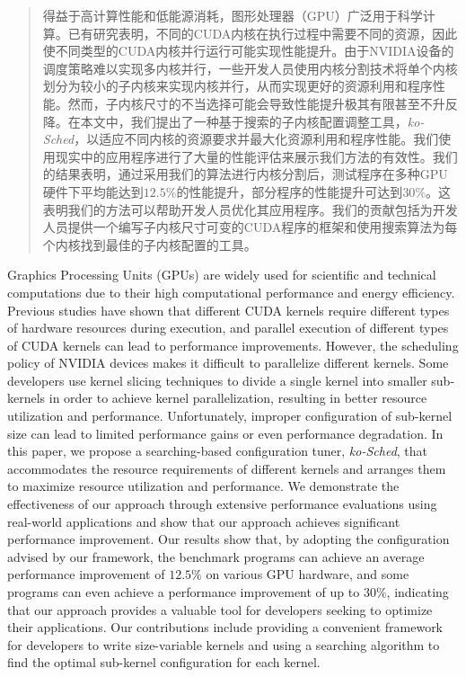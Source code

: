 

\begin{abstract}
  得益于高计算性能和低能源消耗，图形处理器（GPU）广泛用于科学计算。已有研究表明，不同的CUDA内核在执行过程中需要不同的资源，因此使不同类型的CUDA内核并行运行可能实现性能提升。由于NVIDIA设备的调度策略难以实现多内核并行，一些开发人员使用内核分割技术将单个内核划分为较小的子内核来实现内核并行，从而实现更好的资源利用和程序性能。然而，子内核尺寸的不当选择可能会导致性能提升极其有限甚至不升反降。在本文中，我们提出了一种基于搜索的子内核配置调整工具，\emph{ko-Sched}，以适应不同内核的资源要求并最大化资源利用和程序性能。我们使用现实中的应用程序进行了大量的性能评估来展示我们方法的有效性。我们的结果表明，通过采用我们的算法进行内核分割后，测试程序在多种GPU硬件下平均能达到$12.5\%$的性能提升，部分程序的性能提升可达到$30\%$。这表明我们的方法可以帮助开发人员优化其应用程序。我们的贡献包括为开发人员提供一个编写子内核尺寸可变的CUDA程序的框架和使用搜索算法为每个内核找到最佳的子内核配置的工具。
\end{abstract}

\begin{abstract*}
  Graphics Processing Units (GPUs) are widely used for scientific and technical computations due to their high computational performance and energy efficiency. Previous studies have shown that different CUDA kernels require different types of hardware resources during execution, and parallel execution of different types of CUDA kernels can lead to performance improvements. However, the scheduling policy of NVIDIA devices makes it difficult to parallelize different kernels. Some developers use kernel slicing techniques to divide a single kernel into smaller sub-kernels in order to achieve kernel parallelization, resulting in better resource utilization and performance. Unfortunately, improper configuration of sub-kernel size can lead to limited performance gains or even performance degradation. In this paper, we propose a searching-based configuration tuner, \emph{ko-Sched}, that accommodates the resource requirements of different kernels and arranges them to maximize resource utilization and performance. We demonstrate the effectiveness of our approach through extensive performance evaluations using real-world applications and show that our approach achieves significant performance improvement. Our results show that, by adopting the configuration advised by our framework, the benchmark programs can achieve an average performance improvement of $12.5\%$ on various GPU hardware, and some programs can even achieve a performance improvement of up to $30\%$, indicating that our approach provides a valuable tool for developers seeking to optimize their applications. Our contributions include providing a convenient framework for developers to write size-variable kernels and using a searching algorithm to find the optimal sub-kernel configuration for each kernel. 
\end{abstract*}
